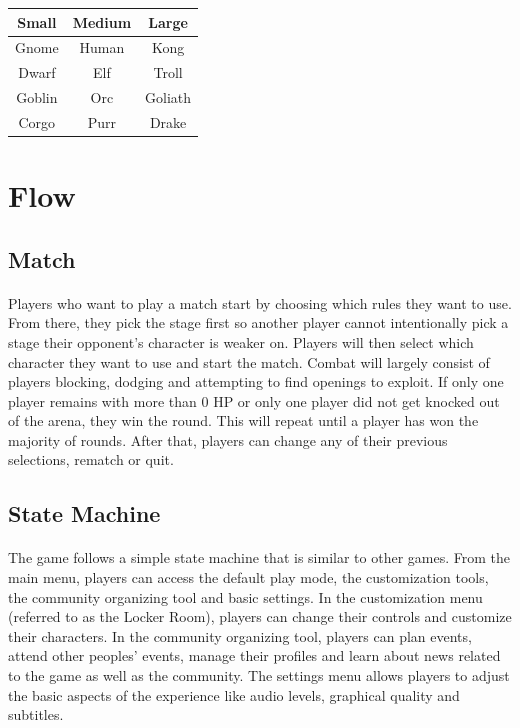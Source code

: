 \begin{table}[h!]
    \centering
    \begin{tabular}{|c|c|c|}
    \hline
    \textbf{Small}  & \textbf{Medium} & \textbf{Large}   \\
    \hline
    Gnome  & Human  & Kong    \\
    \hline
    Dwarf  & Elf    & Troll   \\
    \hline
    Goblin & Orc    & Goliath \\
    \hline
    Corgo  & Purr   & Drake  \\
    \hline
    \end{tabular}
\end{table}

\pagebreak

\section{Flow}

\subsection{Match}

\paragraph{} Players who want to play a match start by choosing which rules they want to use. From there, they pick the stage first so another player cannot intentionally pick a stage their opponent's character is weaker on. Players will then select which character they want to use and start the match. Combat will largely consist of players blocking, dodging and attempting to find openings to exploit. If only one player remains with more than 0 HP or only one player did not get knocked out of the arena, they win the round. This will repeat until a player has won the majority of rounds. After that, players can change any of their previous selections, rematch or quit.


\subsection{State Machine}

\paragraph{} The game follows a simple state machine that is similar to other games. From the main menu, players can access the default play mode, the customization tools, the community organizing tool and basic settings. In the customization menu (referred to as the Locker Room), players can change their controls and customize their characters. In the community organizing tool, players can plan events, attend other peoples' events, manage their profiles and learn about news related to the game as well as the community. The settings menu allows players to adjust the basic aspects of the experience like audio levels, graphical quality and subtitles.

